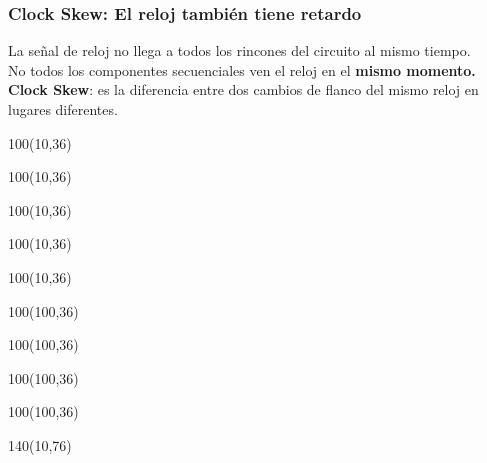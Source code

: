\documentclass[aspectratio=169]{beamer}
\begin{document}
\begin{frame}[fragile,t]
    \frametitle{Clock Skew: El reloj también tiene retardo}
    La señal de reloj no llega a todos los rincones del circuito al mismo tiempo.\\
    \textcolor{verdeuca}{No todos los componentes secuenciales ven el reloj en el \textbf{mismo momento.}}\\
    \bigskip
    \textcolor{naranjauca}{\textbf{Clock Skew}}: es la diferencia entre dos cambios de flanco del mismo reloj en lugares diferentes.\\
    \bigskip
    \begin{textblock}{100}(10,36)  \end{textblock}
    \begin{textblock}{100}(10,36)  \end{textblock}
    \begin{textblock}{100}(10,36)  \end{textblock}
    \begin{textblock}{100}(10,36)  \end{textblock}
    \begin{textblock}{100}(10,36)  \end{textblock}
    \begin{textblock}{100}(100,36)  \end{textblock}
    \begin{textblock}{100}(100,36)  \end{textblock}
    \begin{textblock}{100}(100,36)  \end{textblock}
    \begin{textblock}{100}(100,36)  \end{textblock}
    \begin{textblock}{140}(10,76)  \end{textblock}
\end{frame}
\end{document}

